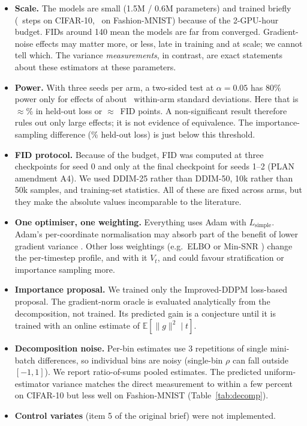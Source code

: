 \begin{itemize}\setlength\itemsep{2pt}
\item \textbf{Scale.} The models are small (1.5M / 0.6M parameters) and trained briefly (\Steps\ steps on CIFAR-10,
\FSteps\ on Fashion-MNIST) because of the 2-GPU-hour budget. FIDs around 140 mean the models are far from
converged. Gradient-noise effects may matter more, or less, late in training and at scale; we cannot tell
which. The variance \emph{measurements}, in contrast, are exact statements about these estimators at these
parameters.
\item \textbf{Power.} With three seeds per arm, a two-sided test at $\alpha=0.05$ has 80\% power only for effects of
about \MDEd\ within-arm standard deviations. Here that is $\approx$\MDEho\% in held-out loss or $\approx$\MDEfid\ FID points.
A non-significant result therefore rules out only large effects; it is not evidence of equivalence. The
importance-sampling difference (\ImpHOdiff\% held-out loss) is just below this threshold.
\item \textbf{FID protocol.} Because of the budget, FID was computed at three checkpoints for seed 0 and only at
the final checkpoint for seeds 1--2 (PLAN amendment A4). We used DDIM-25 rather than DDIM-50, 10k rather than
50k samples, and training-set statistics. All of these are fixed across arms, but they make the absolute values
incomparable to the literature.
\item \textbf{One optimiser, one weighting.} Everything uses Adam with $L_{\text{simple}}$. Adam's per-coordinate
normalisation may absorb part of the benefit of lower gradient variance \citep{jeha2024taylor}. Other loss
weightings (e.g.\ ELBO or Min-SNR \citep{hang2023minsnr}) change the per-timestep profile, and with it
$V_t$, and could favour stratification or importance sampling more.
\item \textbf{Importance proposal.} We trained only the Improved-DDPM loss-based proposal. The gradient-norm
oracle is evaluated analytically from the decomposition, not trained. Its predicted gain is a conjecture until
it is trained with an online estimate of $\mathbb E[\|g\|^2\mid t]$.
\item \textbf{Decomposition noise.} Per-bin estimates use 3 repetitions of single mini-batch differences, so
individual bins are noisy (single-bin $\rho$ can fall outside $[-1,1]$). We report ratio-of-sums pooled
estimates. The predicted uniform-estimator variance matches the direct measurement to within a few percent
on CIFAR-10 but less well on Fashion-MNIST (Table~\ref{tab:decomp}).
\item \textbf{Control variates} (item 5 of the original brief) were not implemented.
\end{itemize}
